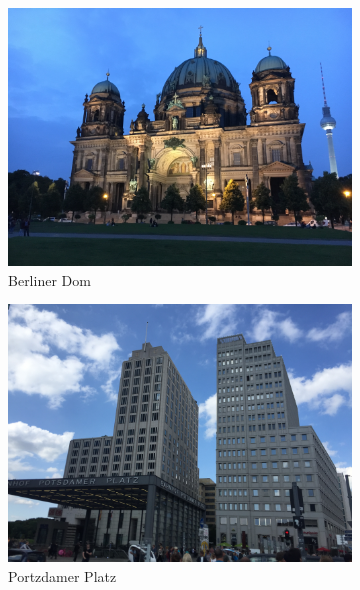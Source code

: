 \begin{figure}[!h]
  \centering
  \begin{subfigure}[h]{0.48\textwidth}
    \includegraphics[width=\linewidth]{images/berlijn/berliner_dom.jpg}
    \caption{Berliner Dom}
  \end{subfigure}
  \begin{subfigure}[h]{0.48\textwidth}
    \includegraphics[width=\linewidth]{images/berlijn/potsdamer_platz.jpg}
    \caption{Portzdamer Platz}
  \end{subfigure}
  \begin{subfigure}[h]{0.48\textwidth}

\end{subfigure}
\end{figure}
